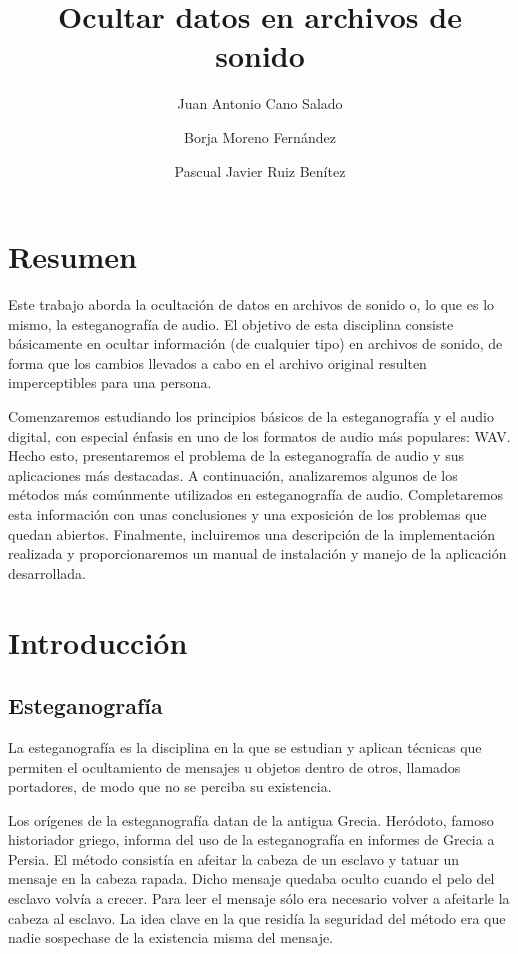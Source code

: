 \documentclass[12pt]{article}
\title{Ocultar datos en archivos de sonido}
\author{Juan Antonio Cano Salado \and Borja Moreno Fernández \and Pascual Javier Ruiz Benítez}
\begin{document}
\maketitle

\newpage
\tableofcontents

\newpage
\section{Resumen}

Este trabajo aborda la ocultación de datos en archivos de sonido o, lo que es lo mismo, la esteganografía de audio. El objetivo de esta disciplina consiste básicamente en ocultar información (de cualquier tipo) en archivos de sonido, de forma que los cambios llevados a cabo en el archivo original resulten imperceptibles para una persona.

Comenzaremos estudiando los principios básicos de la esteganografía y el audio digital, con especial énfasis en uno de los formatos de audio más populares: WAV. Hecho esto, presentaremos el problema de la esteganografía de audio y sus aplicaciones más destacadas. A continuación, analizaremos algunos de los métodos más comúnmente utilizados en esteganografía de audio. Completaremos esta información con unas conclusiones y una exposición de los problemas que quedan abiertos. Finalmente, incluiremos una descripción de la implementación realizada y proporcionaremos un manual de instalación y manejo de la aplicación desarrollada.

\newpage
\section{Introducción}

\subsection{Esteganografía}

La esteganografía es la disciplina en la que se estudian y aplican técnicas que permiten el ocultamiento de mensajes u objetos dentro de otros, llamados portadores, de modo que no se perciba su existencia.

Los orígenes de la esteganografía datan de la antigua Grecia. Heródoto, famoso historiador griego, informa del uso de la esteganografía en informes de Grecia a Persia. El método consistía en afeitar la cabeza de un esclavo y tatuar un mensaje en la cabeza rapada. Dicho mensaje quedaba oculto cuando el pelo del esclavo volvía a crecer. Para leer el mensaje sólo era necesario volver a afeitarle la cabeza al esclavo. La idea clave en la que residía la seguridad del método era que nadie sospechase de la existencia misma del mensaje.
\end{document}
